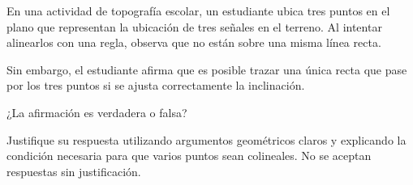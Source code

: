 En una actividad de topografía escolar, un estudiante ubica tres puntos en el plano que representan la ubicación de tres señales en el terreno. Al intentar alinearlos con una regla, observa que no están sobre una misma línea recta.

Sin embargo, el estudiante afirma que es posible trazar una única recta que pase por los tres puntos si se ajusta correctamente la inclinación.

¿La afirmación es verdadera o falsa?

Justifique su respuesta utilizando argumentos geométricos claros y explicando la condición necesaria para que varios puntos sean colineales. No se aceptan respuestas sin justificación.